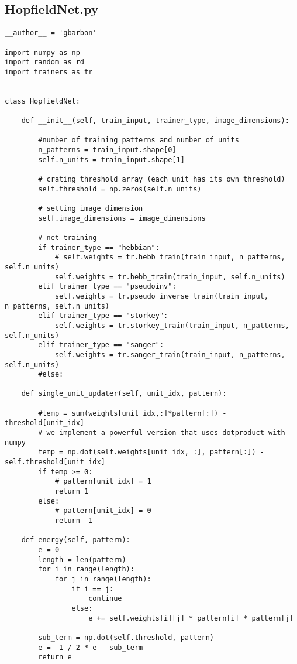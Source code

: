 \documentclass[letterpaper,twocolumn,10pt]{article}
\begin{document}
\subsection{HopfieldNet.py}
\begin{lstlisting}
__author__ = 'gbarbon'

import numpy as np
import random as rd
import trainers as tr


class HopfieldNet:

    def __init__(self, train_input, trainer_type, image_dimensions):

        #number of training patterns and number of units
        n_patterns = train_input.shape[0]
        self.n_units = train_input.shape[1]

        # crating threshold array (each unit has its own threshold)
        self.threshold = np.zeros(self.n_units)

        # setting image dimension
        self.image_dimensions = image_dimensions

        # net training
        if trainer_type == "hebbian":
            # self.weights = tr.hebb_train(train_input, n_patterns, self.n_units)
            self.weights = tr.hebb_train(train_input, self.n_units)
        elif trainer_type == "pseudoinv":
            self.weights = tr.pseudo_inverse_train(train_input, n_patterns, self.n_units)
        elif trainer_type == "storkey":
            self.weights = tr.storkey_train(train_input, n_patterns, self.n_units)
        elif trainer_type == "sanger":
            self.weights = tr.sanger_train(train_input, n_patterns, self.n_units)
        #else:

    def single_unit_updater(self, unit_idx, pattern):

        #temp = sum(weights[unit_idx,:]*pattern[:]) - threshold[unit_idx]
        # we implement a powerful version that uses dotproduct with numpy
        temp = np.dot(self.weights[unit_idx, :], pattern[:]) - self.threshold[unit_idx]
        if temp >= 0:
            # pattern[unit_idx] = 1
            return 1
        else:
            # pattern[unit_idx] = 0
            return -1

    def energy(self, pattern):
        e = 0
        length = len(pattern)
        for i in range(length):
            for j in range(length):
                if i == j:
                    continue
                else:
                    e += self.weights[i][j] * pattern[i] * pattern[j]

        sub_term = np.dot(self.threshold, pattern)
        e = -1 / 2 * e - sub_term
        return e


\end{lstlisting}
\end{document}
